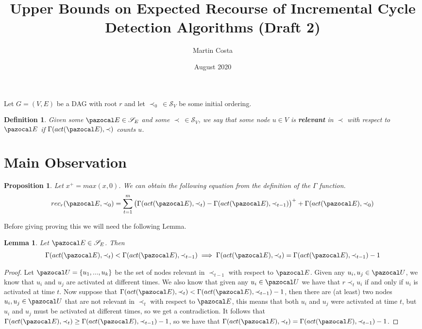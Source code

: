 \documentclass{article}
\title{Upper Bounds on Expected Recourse of Incremental Cycle Detection Algorithms (Draft 2)}
\author{Martin Costa}
\date{August 2020}
\newtheorem{lemma}{Lemma}
\newtheorem{proposition}{Proposition}
\newtheorem{definition}{Definition}
\begin{document}
Let $G=(V,E)$ be a DAG with root $r$ and let $\prec_0 \: \in \mathcal S_V$ be some initial ordering.

\begin{definition}
Given some $\pazocal E \in \mathcal S_E$ and some $\prec \: \in \mathcal S_V$, we say that some node $u \in V$ is \textbf{relevant} in $\prec$ with respect to $\pazocal E$ if $\Gamma(act(\pazocal E), \prec)$ counts $u$.
\end{definition}

\section{Main Observation}

\begin{proposition}\label{mainobservation} Let $x^+=max(x,0)$. We can obtain the following equation from the definition of the $\Gamma$ function.
\[ rec_r(\pazocal E, \prec_0) =  \sum_{t=1}^{m}\big(\Gamma(act(\pazocal E), \prec_{t}) - \Gamma(act(\pazocal E), \prec_{t-1})\big)^+ + \Gamma(act(\pazocal E), \prec_0) \]
\end{proposition}

Before giving proving this we will need the following Lemma.

\begin{lemma} Let $\pazocal E \in \mathcal S_E$. Then
\[ \Gamma(act(\pazocal E), \prec_{t}) < \Gamma(act(\pazocal E), \prec_{t-1}) \implies \Gamma(act(\pazocal E), \prec_{t}) = \Gamma(act(\pazocal E), \prec_{t-1}) - 1  \]
\end{lemma}

\begin{proof}
Let $\pazocal U = \{u_1,...,u_k\}$ be the set of nodes relevant in $\prec_{t-1}$ with respect to $\pazocal E$. Given any $u_i,u_j \in \pazocal U$, we know that $u_i$ and $u_j$ are activated at different times. We also know that given any $u_i \in \pazocal U$ we have that $r \prec_t u_i$ if and only if $u_i$ is activated at time $t$. Now suppose that $\Gamma(act(\pazocal E), \prec_{t}) < \Gamma(act(\pazocal E), \prec_{t-1}) - 1$, then there are (at least) two nodes $u_i, u_j \in \pazocal U$ that are not relevant in $\prec_t$ with respect to $\pazocal E$, this means that both $u_i$ and $u_j$ were activated at time $t$, but $u_i$ and $u_j$ must be activated at different times, so we get a contradiction. It follows that $\Gamma(act(\pazocal E), \prec_{t}) \geq \Gamma(act(\pazocal E), \prec_{t-1}) - 1$, so we have that $\Gamma(act(\pazocal E), \prec_{t}) = \Gamma(act(\pazocal E), \prec_{t-1}) - 1$.
\end{proof}
\end{document}
